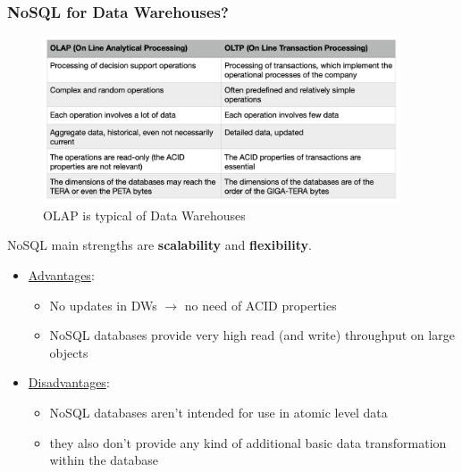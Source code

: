 \documentclass[10pt,a4paper]{article}
\begin{document}
\subsubsection{NoSQL for Data Warehouses?}
\begin{figure}[htp]
\centering
\includegraphics[width=300pt]{images/olap-vs-oltp}\hfill
\caption{OLAP is typical of Data Warehouses}
\end{figure}
NoSQL main strengths are \textbf{scalability} and \textbf{flexibility}.
\begin{itemize}
	\item \uline{Advantages}:
	\begin{itemize}
		\item No updates in DWs $\rightarrow$ no need of ACID properties
		\item NoSQL databases provide very high read (and write) throughput on large objects
	\end{itemize}
	\item \uline{Disadvantages}:
	\begin{itemize}
		\item NoSQL databases aren't intended for use in atomic level data
		\item they also don't provide any kind of additional basic data transformation within the database
	\end{itemize}
\end{itemize}
\end{document}
